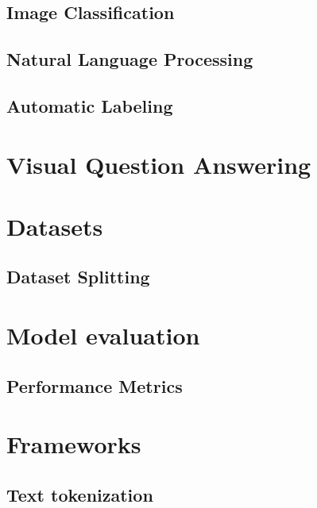     
    \subsection{Image Classification}


    \subsection{Natural Language Processing}
    \subsection{Automatic Labeling}



\section{Visual Question Answering}

    

   

\section{Datasets}


    

     

    \subsection{Dataset Splitting} 


\section{Model evaluation}

    \subsection{Performance Metrics}


\section{Frameworks}

    \subsection{Text tokenization}

